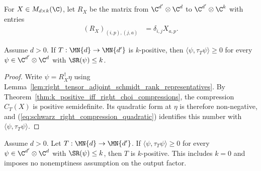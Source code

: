 \begin{definition}
    \label{def:choi_right_tensor_factor}
    \leanok
    For $X\in M_{d\times k}(\C)$, let $R_X$ be the matrix from
    $\C^{d'}\otimes\C^d$ to $\C^{d'}\otimes\C^k$ with entries
    \begin{align}
        (R_X)_{(i,p),(j,a)}
         & =\delta_{i,j}X_{a,p}.
        \label{eq:schwarz_right_tensor_factor}
    \end{align}
\end{definition}
\begin{theorem}
    \label{thm:k_positive_schmidt_rank_choi_expectation}
    \leanok
    Assume $d>0$. If $T:\MN{d}\to\MN{d'}$ is $k$-positive, then
    $\langle\psi,\tau_T\psi\rangle\ge0$ for every
    $\psi\in\C^{d'}\otimes\C^d$ with $\SR(\psi)\le k$.
\end{theorem}

\begin{proof}
    \leanok
    Write $\psi=R_X^\dagger\eta$ using
    Lemma~\ref{lem:right_tensor_adjoint_schmidt_rank_representatives}. By
    Theorem~\ref{thm:k_positive_iff_right_choi_compressions}, the
    compression $C_T(X)$ is positive semidefinite. Its quadratic form at
    $\eta$ is therefore non-negative, and
    (\ref{eq:schwarz_right_compression_quadratic}) identifies this number
    with $\langle\psi,\tau_T\psi\rangle$.
\end{proof}

\begin{theorem}
    \label{thm:schmidt_rank_choi_test_converse}
    \leanok
    Assume $d>0$. Let $T:\MN{d}\to\MN{d'}$. If
    $\langle\psi,\tau_T\psi\rangle\ge0$ for every
    $\psi\in\C^{d'}\otimes\C^d$ with $\SR(\psi)\le k$, then $T$ is
    $k$-positive. This includes $k=0$ and imposes no nonemptiness assumption
    on the output factor.
\end{theorem}

